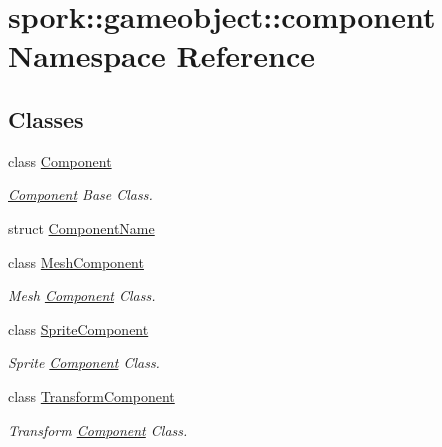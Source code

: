 \hypertarget{namespacespork_1_1gameobject_1_1component}{}\section{spork\+:\+:gameobject\+:\+:component Namespace Reference}
\label{namespacespork_1_1gameobject_1_1component}
\subsection*{Classes}
\begin{DoxyCompactItemize}
\item 
class \hyperlink{classspork_1_1gameobject_1_1component_1_1_component}{Component}
\begin{DoxyCompactList}\small\item\em \hyperlink{classspork_1_1gameobject_1_1component_1_1_component}{Component} Base Class. \end{DoxyCompactList}\item 
struct \hyperlink{structspork_1_1gameobject_1_1component_1_1_component_name}{Component\+Name}
\item 
class \hyperlink{classspork_1_1gameobject_1_1component_1_1_mesh_component}{Mesh\+Component}
\begin{DoxyCompactList}\small\item\em Mesh \hyperlink{classspork_1_1gameobject_1_1component_1_1_component}{Component} Class. \end{DoxyCompactList}\item 
class \hyperlink{classspork_1_1gameobject_1_1component_1_1_sprite_component}{Sprite\+Component}
\begin{DoxyCompactList}\small\item\em Sprite \hyperlink{classspork_1_1gameobject_1_1component_1_1_component}{Component} Class. \end{DoxyCompactList}\item 
class \hyperlink{classspork_1_1gameobject_1_1component_1_1_transform_component}{Transform\+Component}
\begin{DoxyCompactList}\small\item\em Transform \hyperlink{classspork_1_1gameobject_1_1component_1_1_component}{Component} Class. \end{DoxyCompactList}\end{DoxyCompactItemize}

